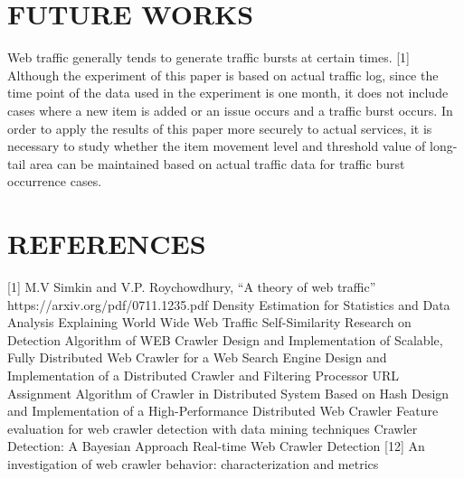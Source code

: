 \documentclass[sigconf,anonymous=false]{acmart}
\begin{document}
%
%
\section{FUTURE WORKS}
Web traffic generally tends to generate traffic bursts at certain times. [1] Although the experiment of this paper is based on actual traffic log, since the time point of the data used in the experiment is one month, it does not include cases where a new item is added or an issue occurs and a traffic burst occurs.
In order to apply the results of this paper more securely to actual services, it is necessary to study whether the item movement level and threshold value of long-tail area can be maintained based on actual traffic data for traffic burst occurrence cases.



%
%
\section{REFERENCES}
[1]	M.V Simkin and V.P. Roychowdhury, “A theory of web traffic” https://arxiv.org/pdf/0711.1235.pdf
\newline[2] Density Estimation for Statistics and Data Analysis
\newline[3] Explaining World Wide Web Traffic Self-Similarity
\newline[4] Research on Detection Algorithm of WEB Crawler
\newline[5] Design and Implementation of Scalable, Fully Distributed Web Crawler for a Web Search Engine
\newline[6] Design and Implementation of a Distributed Crawler and Filtering Processor
\newline[7] URL Assignment Algorithm of Crawler in Distributed System Based on Hash
\newline[8] Design and Implementation of a High-Performance Distributed Web Crawler
\newline[9] Feature evaluation for web crawler detection with data mining techniques
\newline[10] Crawler Detection: A Bayesian Approach
\newline[11] Real-time Web Crawler Detection
[12] An investigation of web crawler behavior: characterization and metrics








%
\end{document}

